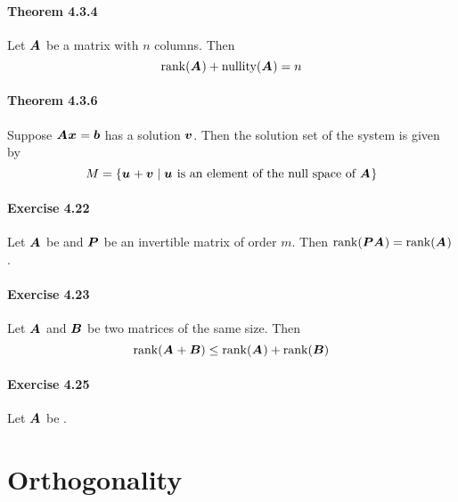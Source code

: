 \documentclass[a4paper]{article}
\begin{document}
\begin{multicols*}{3}
      \paragraph{Theorem 4.3.4} Let $\A$ be a matrix with $n$ columns. Then
        \begin{equation*}
          \matrank{\A} + \matnullity{\A} = n
        \end{equation*}
      \paragraph{Theorem 4.3.6} Suppose $\A\x = \b$ has a solution $\v$. Then the solution set of the system is given by
      \begin{equation*}
        M = \{ \u + \v \;\vert\; \u \text{ is an element of the null space of } \A \}
      \end{equation*}
      \paragraph{Exercise 4.22} Let $\A$ be  and $\P$ be an invertible matrix of order $m$. Then $\matrank{\P\A} = \matrank{\A}$.
      \paragraph{Exercise 4.23} Let $\A$ and $\B$ be two matrices of the same size. Then
        \begin{equation*}
          \matrank{\A + \B} \leq \matrank{\A} + \matrank{\B}
        \end{equation*}
      \paragraph{Exercise 4.25} Let $\A$ be .
  \section*{Orthogonality}

\end{multicols*}
\end{document}
